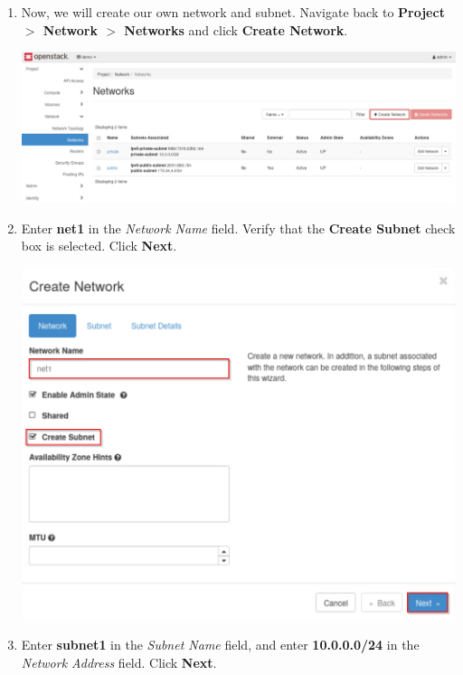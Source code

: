 \documentclass[letterpaper, 12pt]{article}
\begin{document}
\begin{enumerate}
    \item Now, we will create our own network and subnet. Navigate back to \textbf{Project $>$ Network $>$ Networks} and
    click \textbf{Create Network}.

    \begin{center}
        \includegraphics[width=\linewidth]{images/part3/step7.png}
    \end{center}

    \item Enter \textbf{net1} in the \textit{Network Name} field. Verify that the \textbf{Create Subnet} check box is
    selected. Click \textbf{Next}.

    \begin{center}
        \includegraphics[width=\linewidth]{images/part3/step8.png}
    \end{center}

    \item Enter \textbf{subnet1} in the \textit{Subnet Name} field, and enter \textbf{10.0.0.0/24} in the
    \textit{Network Address} field. Click \textbf{Next}.


\end{enumerate}
\end{document}
